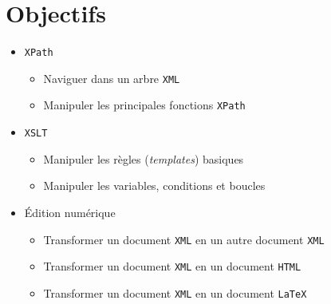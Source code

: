 \documentclass[a4paper]{article}
\begin{document}
\bigskip

\section*{Objectifs}
      \begin{itemize}
          \item \texttt{XPath}
          \begin{itemize}
              \item Naviguer dans un arbre \texttt{XML}
              \item Manipuler les principales fonctions \texttt{XPath}
          \end{itemize}
          \item \texttt{XSLT}
          \begin{itemize}
              \item Manipuler les règles (\textit{templates}) basiques
              \item Manipuler les variables, conditions et boucles
          \end{itemize}
          \item Édition numérique
          \begin{itemize}
              \item Transformer un document \texttt{XML} en un autre document \texttt{XML}
              \item Transformer un document \texttt{XML} en un document \texttt{HTML}
              \item Transformer un document \texttt{XML} en un document \texttt{LaTeX}
          \end{itemize}
      \end{itemize}
\end{document}

